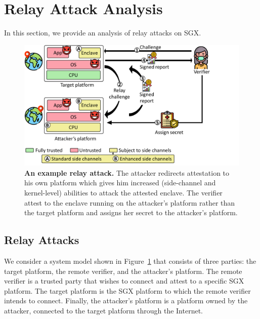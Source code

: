 \section{Relay Attack Analysis}
\label{sec:problemStatement}

In this section, we provide an analysis of relay attacks on SGX. 

\begin{figure}[t]
 \centering
  \includegraphics[trim={0 0 4.5cm 0},clip,width=0.9\linewidth]{chapters/ProximiTEE/images_new/relay.pdf}
 \caption[An example relay attack]{\textbf{An example relay attack.} The attacker redirects attestation to his own platform which gives him increased (side-channel and kernel-level) abilities to attack the attested enclave. The verifier attest to the enclave running on the attacker's platform rather than the target platform and assigns her secret to the attacker's platform.}

 \label{fig:SystemModel}
\end{figure}


\subsection{Relay Attacks}
\label{sec:problemStatement:systemAttackerModel}

We consider a system model shown in Figure~\ref{fig:SystemModel} that consists of three parties: the target platform, the remote verifier, and the attacker's platform. The remote verifier is a trusted party that wishes to connect and attest to a specific SGX platform. The target platform is the SGX platform to which the remote verifier intends to connect. Finally, the attacker's platform is a platform owned by the attacker, connected to the target platform through the Internet.



